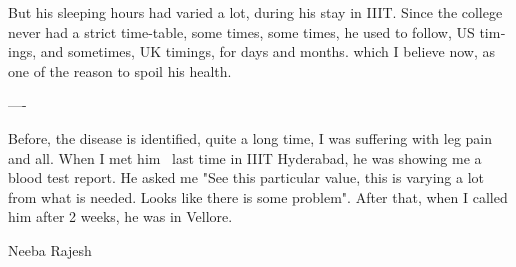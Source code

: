 \begin{english}
But his sleeping hours had varied a lot, during his stay in IIIT. Since the college never had a strict time-table, some times, some times, he used to follow, US timings, and sometimes, UK timings, for days and months. which I believe now, as one of the reason to spoil his health.
\begin{center}
---- 
\end{center}
Before, the disease is identified, quite a long time, I was suffering with leg pain and all. When I met him  last time in IIIT Hyderabad, he was showing me a blood test report. He asked me "See this particular value, this is varying a lot from what is needed. Looks like there is some problem". After that, when I called him after 2 weeks, he was in Vellore.

Neeba Rajesh
\end{english}
\newpage
